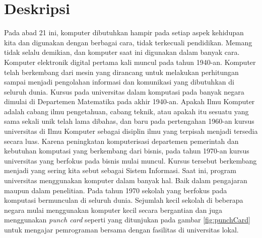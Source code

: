\documentclass[a4paper,twoside]{article}
\begin{document}
\title{\@judultopik}
\author{\nama \textendash \@npm} 

\newcommand{\nama}{Edwin Pranajaya}
\newcommand{\@npm}{2017730027}
\newcommand{\@judultopik}{Dukungan Bahasa JavaScript pada SharIF Judge} %
\newcommand{\jumpemb}{1} %
\newcommand{\tanggal}{22/02/2022}


\maketitle


\section{Deskripsi}
Pada abad 21 ini, komputer dibutuhkan hampir pada setiap aspek kehidupan kita dan digunakan dengan berbagai cara, tidak terkecuali pendidikan\cite{encyclopedia_2020}. Memang tidak selalu demikian, dan komputer saat ini digunakan dalam banyak cara. Komputer elektronik digital pertama kali muncul pada tahun 1940-an. Komputer telah berkembang dari mesin yang dirancang untuk melakukan perhitungan sampai menjadi pengolahan informasi dan komunikasi yang dibutuhkan di seluruh dunia. Kursus pada universitas dalam komputasi pada banyak negara dimulai di Departemen Matematika pada akhir 1940-an. Apakah Ilmu Komputer adalah cabang ilmu pengetahuan, cabang teknik, atau apakah itu sesuatu yang sama sekali unik telah lama dibahas, dan baru pada pertengahan 1960-an kursus universitas di Ilmu Komputer sebagai disiplin ilmu yang terpisah menjadi tersedia secara luas. Karena peningkatan komputerisasi departemen pemerintah dan kebutuhan komputasi yang berkembang dari bisnis, pada tahun 1970-an kursus universitas yang berfokus pada bisnis mulai muncul. Kursus tersebut berkembang menjadi yang sering kita sebut sebagai Sistem Informasi. Saat ini, program universitas menggunakan komputer dalam banyak hal. Baik dalam pengajaran maupun dalam penelitian. Pada tahun 1970 sekolah yang berfokus pada komputasi bermunculan di seluruh dunia. Sejumlah kecil sekolah di beberapa negara mulai menggunakan komputer kecil secara bergantian dan juga menggunakan \textit{punch card} seperti yang ditunjukan pada gambar \ref{fig:punchCard} untuk mengajar pemrograman bersama dengan fasilitas di universitas lokal. 
\newpage
\end{document}
